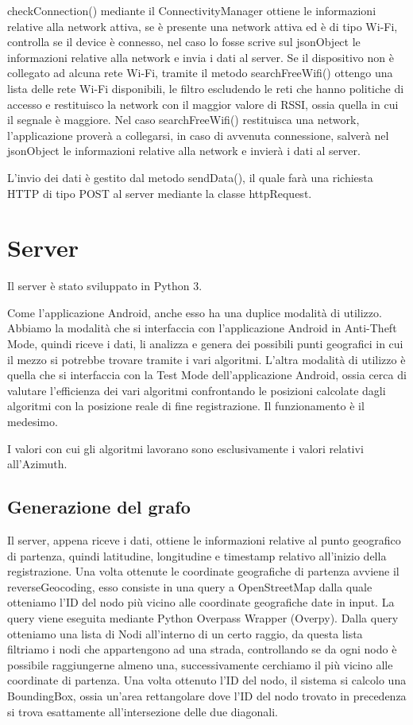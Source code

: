 \documentclass[12pt,a4paper,openright,twoside]{report}
\begin{document}
checkConnection() mediante il ConnectivityManager ottiene le informazioni relative alla network attiva, se è presente una network attiva ed è di tipo Wi-Fi, controlla se il device è connesso, nel caso lo fosse scrive sul jsonObject le informazioni relative alla network e invia i dati al server.
Se il dispositivo non è collegato ad alcuna rete Wi-Fi, tramite il metodo searchFreeWifi() ottengo una lista delle rete Wi-Fi disponibili, le filtro escludendo le reti che hanno politiche di accesso e restituisco la network con il maggior valore di RSSI, ossia quella in cui il segnale è maggiore. 
Nel caso searchFreeWifi() restituisca una network, l'applicazione proverà a collegarsi, in caso di avvenuta connessione, salverà nel jsonObject le informazioni relative alla network e invierà i dati al server.

L'invio dei dati è gestito dal metodo sendData(), il quale farà una richiesta HTTP di tipo POST al server mediante la classe httpRequest.

\newpage
\section{Server}
Il server è stato sviluppato in Python 3.

Come l'applicazione Android, anche esso ha una duplice modalità di utilizzo. Abbiamo la modalità che si interfaccia con l'applicazione Android in Anti-Theft Mode, quindi riceve i dati, li analizza e genera dei possibili punti geografici in cui il mezzo si potrebbe trovare tramite i vari algoritmi. L'altra modalità di utilizzo è quella che si interfaccia con la Test Mode dell'applicazione Android, ossia cerca di valutare l'efficienza dei vari algoritmi confrontando le posizioni calcolate dagli algoritmi con la posizione reale di fine registrazione. 
Il funzionamento è il medesimo.

I valori con cui gli algoritmi lavorano sono esclusivamente i valori relativi all'Azimuth.

\subsection{Generazione del grafo}

Il server, appena riceve i dati, ottiene le informazioni relative al punto geografico di partenza, quindi latitudine, longitudine e timestamp relativo all'inizio della registrazione.
Una volta ottenute le coordinate geografiche di partenza avviene il reverseGeocoding, esso consiste in una query a OpenStreetMap dalla quale otteniamo l'ID del nodo più vicino alle coordinate geografiche date in input. La query viene eseguita mediante Python Overpass Wrapper (Overpy). Dalla query otteniamo una lista di Nodi all'interno di un certo raggio, da questa lista filtriamo i nodi che appartengono ad una strada, controllando se da ogni nodo è possibile raggiungerne almeno una, successivamente cerchiamo il più vicino alle coordinate di partenza.
Una volta ottenuto l'ID del nodo, il sistema si calcolo una BoundingBox, ossia un'area rettangolare dove l'ID del nodo trovato in precedenza si trova esattamente all'intersezione delle due diagonali. 
\end{document}
